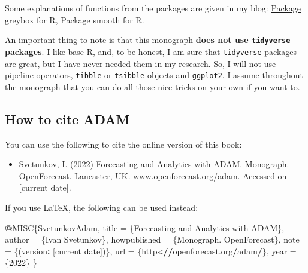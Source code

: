 \documentclass[]{book}
\newenvironment{Shaded}{\begin{snugshade}}{\end{snugshade}}
\newcommand{\DecValTok}[1]{\textcolor[rgb]{0.00,0.00,0.81}{#1}}
\newcommand{\ErrorTok}[1]{\textcolor[rgb]{0.64,0.00,0.00}{\textbf{#1}}}
\newcommand{\NormalTok}[1]{#1}
\newcommand{\OperatorTok}[1]{\textcolor[rgb]{0.81,0.36,0.00}{\textbf{#1}}}
\newcommand{\StringTok}[1]{\textcolor[rgb]{0.31,0.60,0.02}{#1}}
\providecommand{\tightlist}{%
  \setlength{\itemsep}{0pt}\setlength{\parskip}{0pt}}
\theoremstyle{definition}
\theoremstyle{definition}
\theoremstyle{definition}
\theoremstyle{definition}
\theoremstyle{remark}
\begin{document}
Some explanations of functions from the packages are given in my blog: \href{https://forecasting.svetunkov.ru/en/category/r-en/greybox/}{Package greybox for R}, \href{https://forecasting.svetunkov.ru/en/category/r-en/smooth/}{Package smooth for R}.

An important thing to note is that this monograph \textbf{does not use \texttt{tidyverse} packages}. I like base R, and, to be honest, I am sure that \texttt{tidyverse} packages are great, but I have never needed them in my research. So, I will not use pipeline operators, \texttt{tibble} or \texttt{tsibble} objects and \texttt{ggplot2}. I assume throughout the monograph that you can do all those nice tricks on your own if you want to.

\hypertarget{how-to-cite-adam}{%
\subsection*{How to cite ADAM}\label{how-to-cite-adam}}

You can use the following to cite the online version of this book:

\begin{itemize}
\tightlist
\item
  Svetunkov, I. (2022) Forecasting and Analytics with ADAM. Monograph. OpenForecast. Lancaster, UK. www.openforecast.org/adam. Accessed on {[}current date{]}.
\end{itemize}

If you use LaTeX, the following can be used instead:

\begin{Shaded}
\begin{Highlighting}[]
\OperatorTok{@}\NormalTok{MISC\{SvetunkovAdam,}
\NormalTok{    title =}\StringTok{ }\NormalTok{\{Forecasting and Analytics with ADAM\},}
\NormalTok{    author =}\StringTok{ }\NormalTok{\{Ivan Svetunkov\},}
\NormalTok{    howpublished =}\StringTok{ }\NormalTok{\{Monograph. OpenForecast\},}
\NormalTok{    note =}\StringTok{ }\NormalTok{\{(version}\OperatorTok{:}\StringTok{ }\NormalTok{[current date])\},}
\NormalTok{    url =}\StringTok{ }\NormalTok{\{https}\OperatorTok{:}\ErrorTok{//}\NormalTok{openforecast.org}\OperatorTok{/}\NormalTok{adam}\OperatorTok{/}\NormalTok{\},}
\NormalTok{    year =}\StringTok{ }\NormalTok{\{}\DecValTok{2022}\NormalTok{\}}
\NormalTok{\}}
\end{Highlighting}
\end{Shaded}
\end{document}
